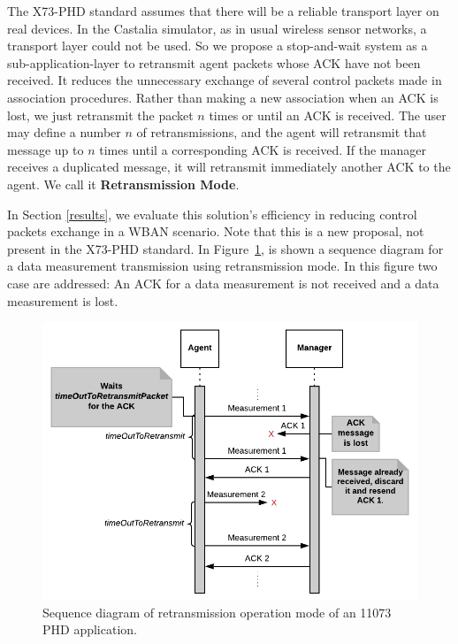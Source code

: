 The X73-PHD standard assumes that there will be a reliable transport layer on real devices. In the Castalia simulator, as in usual wireless sensor networks, a transport layer could not be used. So we propose a stop-and-wait system as a sub-application-layer to retransmit agent packets whose ACK have not been received.
It reduces the unnecessary exchange of several control packets made in association procedures. Rather than making a new association when an ACK is lost, we just retransmit the packet $n$ times or until an ACK is received.
The user may define a number $n$ of retransmissions, and the agent will retransmit that message up to $n$ times until a corresponding ACK is received. If the manager receives a duplicated message, it will retransmit immediately another ACK to the agent. We call it \textbf{Retransmission Mode}.

In Section \ref{results}, we evaluate this solution's efficiency in reducing control packets exchange in a WBAN scenario. Note that this is a new proposal, not present in the X73-PHD standard. In Figure~\ref{fig:retransmissionMode}, is shown a sequence diagram for a data measurement transmission using retransmission mode. In this figure two case are addressed: An ACK for a data measurement is not received and a data measurement is lost.

\begin{figure}[htbp]
\centerline{\includegraphics[width=\linewidth]{figures/retransmissionModeWithAckLoss.png}}
\caption{Sequence diagram of retransmission operation mode of an 11073 PHD application.}
\label{fig:retransmissionMode}
\end{figure}


